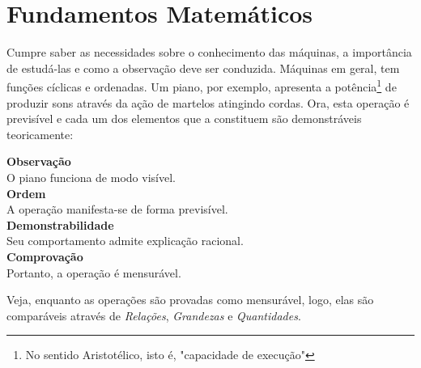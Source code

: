 \section{Fundamentos Matemáticos}
Cumpre saber as necessidades sobre o conhecimento das máquinas, a importância de estudá-las 
e como a observação deve ser conduzida. Máquinas em geral, tem funções cíclicas e ordenadas. 
Um piano, por exemplo, apresenta a potência\footnote{No sentido Aristotélico, isto é, 
"capacidade de execução"}  de produzir sons através da ação de martelos atingindo cordas. 
Ora, esta operação é previsível e cada um dos elementos que a constituem são demonstráveis teoricamente:

\begin{center}
\large{\textbf{Observação}}
\\ O piano funciona de modo visível. \\
\large{\textbf{Ordem}}
\\ A operação manifesta-se de forma previsível. \\
\large{\textbf{Demonstrabilidade}}
\\ Seu comportamento admite explicação racional. \\
\large{\textbf{Comprovação}}
\\ Portanto, a operação é mensurável. \\
    
\end{center}

Veja, enquanto as operações são provadas como mensurável, logo, elas são comparáveis 
através de \textit{Relações}, \textit{Grandezas} e \textit{Quantidades}.


